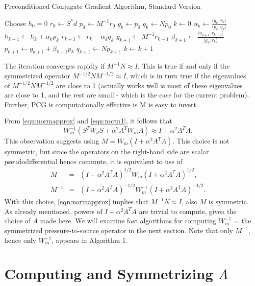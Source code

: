\documentclass[georeport,12pt]{geophysics}
\begin{document}
\begin{algorithm}[H]
\caption{Preconditioned Conjugate Gradient Algorithm, Standard Version}
\begin{algorithmic}[1]
\State Choose $h_0=0$ 
  \State $r_0 \gets S^*d$
  \State $p_0 \gets M^{-1} r_0$
  \State $g_0 \gets p_0$
  \State $q_0 \gets Np_0$
  \State $k \gets 0$
  \Repeat
  \State $\alpha_k \gets \frac{\langle g_k,r_k \rangle}{\langle p_k,q_k\rangle}$
  \State $h_{k+1} \gets h_k + \alpha_k p_k$
  \State $r_{k+1} \gets r_k - \alpha_kq_k$
  \State $g_{k+1} \gets M^{-1} r_{k+1}$
  \State $\beta_{k+1} \gets \frac{\langle g_{k+1},r_{k+1}\rangle}{\langle g_k,r_k\rangle}$
  \State $p_{k+1}\gets g_{k+1}+\beta_{k+1}p_k$
  \State $q_{k+1} \gets Np_{k+1}$
  \State $k \gets k+1$
\end{algorithmic}
\end{algorithm}
The iteration converges rapidly if $M^{-1}N \approx I$. This is true
if and only if the symmetrized operator $M^{-1/2}NM^{-1/2} \approx I$,
which is in turn true if the eigenvalues of $M^{-1/2}NM^{-1/2}$ are
close to 1 (actually works well is most of these eigenvalues are close
to 1, and the rest are small - which is the case for the current
problem)..  Further, PCG is computationally effective is M is easy to
invert.

From \ref{eqn:normapprox} and \ref{eqn:norm1}, it follows that
\[
  W_m^{-1}(S^TW_dS + \alpha^2 A^TW_mA) \approx I + \alpha^2 A^TA.
\]
This observation suggests using $M=W_m(I+\alpha^2A^TA)$. This choice
is not symmetric, but since the operators on the right-hand side are
scalar pseudodifferential hence commute, it is equivalent to use of
\begin{eqnarray}
  M         &=&(I+\alpha^2A^TA)^{1/2}W_m(I+\alpha^2A^TA)^{1/2},\nonumber \\
  M^{-1}
            &=&(I+\alpha^2A^TA)^{-1/2}W_m^{-1}(I+\alpha^2A^TA)^{-1/2}.
                \label{eqn:defprecond}
\end{eqnarray}
With this choice, \ref{eqn:normapprox} implies that
$M^{-1}N \approx I$, also $M$ is symmetric. As already mentioned,
powers of $I + \alpha^2A^TA$ are trivial to compute, given the choice
of $A$ made here. We will examine fast algorithms for computing
$W_m^{-1}$ = the symmetrized pressure-to-source operator in the next
section. Note that only $M^{-1}$, hence only $W_m^{-1}$, appears in
Algorithm 1.


\section{Computing and Symmetrizing $\Lambda$}
\end{document}
